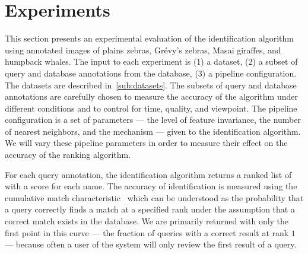 
\section{Experiments}\label{sec:experiments}

    This section presents an experimental evaluation of the identification algorithm using annotated images of
      plains zebras, Grévy's zebras, Masai giraffes, and humpback whales.
    The input to each experiment is
    (1) a dataset,
    (2) a subset of query and database annotations from the database,
    (3) a pipeline configuration.
    The datasets are described in~\cref{sub:datasets}.
    The subsets of query and database annotations are carefully chosen to measure the accuracy of the algorithm
      under different conditions and to control for time, quality, and viewpoint.
    The pipeline configuration is a set of parameters --- \eg{} the level of feature invariance, the number of
      nearest neighbors, and the \namescoring{} mechanism --- given to the identification algorithm.
    We will vary these pipeline parameters in order to measure their effect on the accuracy of the ranking
      algorithm.

    For each query annotation, the identification algorithm returns a ranked list of \names{} with a score for
      each name.
    The accuracy of identification is measured using the cumulative match
      characteristic~\cite{decann_relating_2013} which can be understood as the probability that a query correctly
      finds a match at a specified rank under the assumption that a correct match exists in the database.
    We are primarily returned with only the first point in this curve --- the fraction of queries with a correct
      result at rank $1$ --- because often a user of the system will only review the first result of a query.


